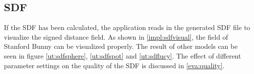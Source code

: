 \subsection{SDF}
\label{eva:sdf}

If the SDF has been calculated, the application reads in the generated SDF file to visualize the signed distance field. As shown in \ref{impl:sdfvisual}, the field of Stanford Bunny can be visualized properly. The result of other models can be seen in figure \ref{ut:sdfsphere}, \ref{ut:sdfspot} and \ref{ut:sdflucy}. The effect of different parameter settings on the quality of the SDF is discussed in \ref{eva:quality}.

\begin{figure}[htbp]
    \centering
\end{figure}
